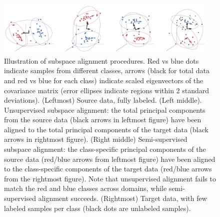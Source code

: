 \documentclass[letterpaper]{article} %
\begin{document}
\begin{figure}[!t]
    \centering
    \includegraphics[width=0.95\textwidth]{2DG_subalign_error-ellips.pdf}
    \caption{Illustration of subspace alignment procedures. Red vs blue dots indicate samples from different classes, arrows (black for total data and red vs blue for each class) indicate scaled eigenvectors of the covariance matrix (error ellipses indicate regions within 2 standard deviations). (Leftmost) Source data, fully labeled. (Left middle). Unsupervised subspace alignment: the total principal components from the source data (black arrows in leftmost figure) have been aligned to the total principal components of the target data (black arrows in rightmost figure). (Right middle) Semi-supervised subspace alignment: the class-specific principal components of the source data (red/blue arrows from leftmost figure) have been aligned to the class-specific components of the target data (red/blue arrows from the rightmost figure). Note that unsupervised alignment fails to match the red and blue classes across domains, while semi-supervised alignment succeeds. (Rightmost) Target data, with few labeled samples per class (black dots are unlabeled samples).}
    \label{fig:2DG_subalign}
\end{figure}
\end{document}
